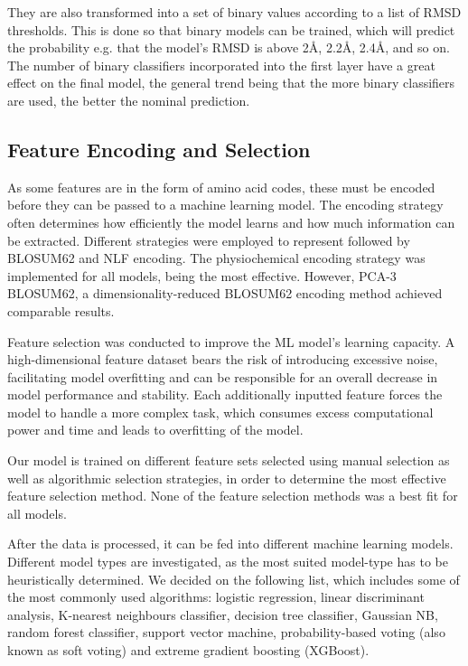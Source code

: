 \documentclass[12pt]{article}
\begin{document}
They are also transformed into a set of binary values according to a
list of RMSD thresholds. This is done so that binary models can be
trained, which will predict the probability e.g. that the model's RMSD
is above 2\AA, 2.2\AA, 2.4\AA, and so on. The number of binary
classifiers incorporated into the first layer have a great effect on
the final model, the general trend being that the more binary
classifiers are used, the better the nominal prediction.

\subsection{Feature Encoding and Selection}

As some features are in the form of amino acid codes, these must be
encoded before they can be passed to a machine learning model. The
encoding strategy often determines how efficiently the model learns
and how much information can be extracted. Different strategies were
employed to represent followed by BLOSUM62 and NLF encoding. The
physiochemical encoding strategy was implemented for all models, being
the most effective. However, PCA-3 BLOSUM62, a dimensionality-reduced
BLOSUM62 encoding method achieved comparable results.

Feature selection was conducted to improve the ML model's learning
capacity. A high-dimensional feature dataset bears the risk of
introducing excessive noise, facilitating model overfitting and can be
responsible for an overall decrease in model performance and
stability. Each additionally inputted feature forces the model to
handle a more complex task, which consumes excess computational power
and time and leads to overfitting of the model.

Our model is trained on different feature sets selected using manual
selection as well as algorithmic selection strategies, in order to
determine the most effective feature selection method. None of the
feature selection methods was a best fit for all models.

After the data is processed, it can be fed into different machine
learning models. Different model types are investigated, as the most
suited model-type has to be heuristically determined. We decided on
the following list, which includes some of the most commonly used
algorithms: logistic regression, linear discriminant analysis,
K-nearest neighbours classifier, decision tree classifier, Gaussian
NB, random forest classifier, support vector machine,
probability-based voting (also known as soft voting) and extreme
gradient boosting (XGBoost)\cite{Chen2016}.
\end{document}
